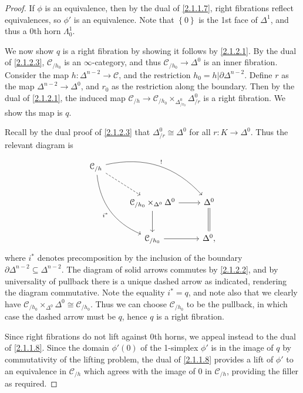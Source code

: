\begin{proof}
	If $\phi $ is an equivalence, then by the dual of \cref{2.1.1.7}, right fibrations reflect equivalences, so $\phi '$ is an equivalence. Note that $\left\{ 0 \right\} $ is the 1st face of $\Delta ^1$, and thus a 0th horn $\Lambda _0^1$.

	We now show $q$ is a right fibration by showing it follows by \cref{2.1.2.1}. By the dual of \cref{2.1.2.3}, $\mathcal{C} _{/h_0} $ is an $\infty $-category, and thus $\mathcal{C} _{/h_0} \to \Delta ^0$ is an inner fibration. Consider the map $h : \Delta ^{n-2}  \to \mathcal{C} $, and the restriction $h_0 = h|\partial \Delta ^{n-2} $. Define $r$ as the map $\Delta ^{n-2} \to \Delta ^0$, and $r_0$ as the restriction along the boundary. Then by the dual of \cref{2.1.2.1}, the induced map $\mathcal{C} _{/h} \to \mathcal{C} _{/h_0} \times _{\Delta ^0_{/r_0} } \Delta ^0_{/r} $ is a right fibration. We show ths map is $q$.

	Recall by the dual proof of \cref{2.1.2.3} that $\Delta ^0_{/r} \cong \Delta ^0$ for all $r : K \to \Delta ^0$. Thus the relevant diagram is
	\[\begin{tikzcd}[row sep = 2.5em, column sep = 2.5em]
	\mathcal{C} _{/h} \ar[" ! ", bend left, drr] \ar[" i^* "', bend right, ddr] \ar[dashed, dr]  &  &  \\
	 & \mathcal{C} _{/h_0} \times_{\Delta ^0} \Delta ^0 \ar[r] \ar[d]  & \Delta ^0 \ar[equals, d]  \\
	 & \mathcal{C} _{/h_0} \ar[r]  & \Delta ^0,
	\end{tikzcd}\]
	where $i^*$ denotes precomposition by the inclusion of the boundary $\partial \Delta ^{n-2} \subseteq \Delta ^{n-2} $. The diagram of solid arrows commutes by \cref{2.1.2.2}, and by universality of pullback there is a unique dashed arrow as indicated, rendering the diagram commutative. Note the equality $i^*=q$, and note also that we clearly have $\mathcal{C}_{/h_0} \times _{\Delta ^0}\Delta ^0 \cong \mathcal{C} _{/h_0} $. Thus we can choose $\mathcal{C} _{/h_0} $ to be the pullback, in which case the dashed arrow must be $q$, hence $q$ is a right fibration.

	Since right fibrations do not lift against 0th horns, we appeal instead to the dual of \cref{2.1.1.8}. Since the domain $\phi '(0)$ of the 1-simplex $\phi '$ is in the image of $q$ by commutativity of the lifting problem, the dual of \cref{2.1.1.8} provides a lift of $\phi '$ to an equivalence in $\mathcal{C} _{/h} $ which agrees with the image of $0$ in $\mathcal{C} _{/h} $, providing the filler as required.


\end{proof}
